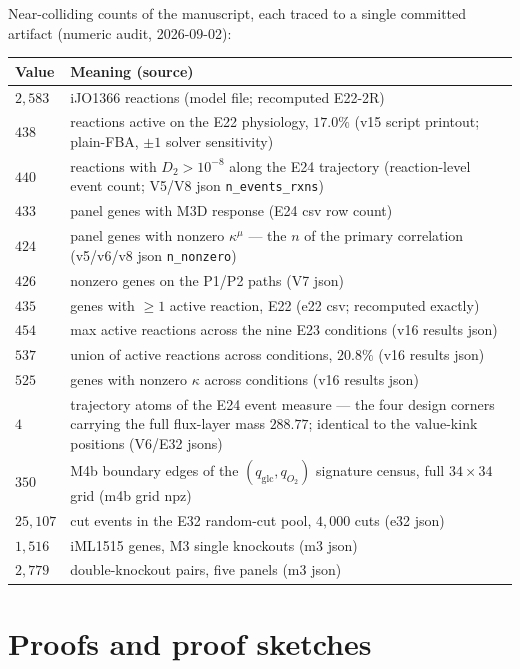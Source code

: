 \documentclass[11pt,a4paper]{article}
\theoremstyle{plain}
\theoremstyle{definition}
\theoremstyle{remark}
\newcommand{\kmu}{\kappa^{\mu}}
\begin{document}
Near-colliding counts of the manuscript, each traced to a single
committed artifact (numeric audit, 2026-09-02):

\begin{tabularx}{\textwidth}{l>{\raggedright\arraybackslash}X}
\toprule
\textbf{Value} & \textbf{Meaning (source)} \\
\midrule
$2{,}583$ & iJO1366 reactions (model file; recomputed E22-2R) \\
$438$ & reactions active on the E22 physiology, $17.0\%$ (v15
         script printout; plain-FBA, $\pm 1$ solver sensitivity) \\
$440$ & reactions with $D_2 > 10^{-8}$ along the E24 trajectory
         (reaction-level event count; V5/V8 json
         \texttt{n\_events\_rxns}) \\
$433$ & panel genes with M3D response (E24 csv row count) \\
$424$ & panel genes with nonzero $\kmu$ --- the $n$ of the primary
         correlation (v5/v6/v8 json \texttt{n\_nonzero}) \\
$426$ & nonzero genes on the P1/P2 paths (V7 json) \\
$435$ & genes with $\ge 1$ active reaction, E22 (e22 csv;
         recomputed exactly) \\
$454$ & max active reactions across the nine E23 conditions (v16
         results json) \\
$537$ & union of active reactions across conditions, $20.8\%$ (v16
         results json) \\
$525$ & genes with nonzero $\kappa$ across conditions (v16 results
         json) \\
$4$ & trajectory atoms of the E24 event measure --- the four design
         corners carrying the full flux-layer mass $288.77$; identical
         to the value-kink positions (V6/E32 jsons) \\
$350$ & M4b boundary edges of the $(q_{\mathrm{glc}}, q_{O_2})$ signature
         census, full $34\times34$ grid (m4b grid npz) \\
$25{,}107$ & cut events in the E32 random-cut pool, $4{,}000$ cuts
         (e32 json) \\
$1{,}516$ & iML1515 genes, M3 single knockouts (m3 json) \\
$2{,}779$ & double-knockout pairs, five panels (m3 json) \\
\bottomrule
\end{tabularx}

\section{Proofs and proof sketches}\label{sec:proofs}
\end{document}
